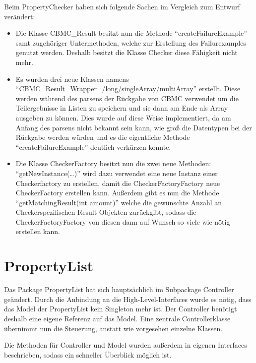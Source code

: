 \documentclass[a4paper]{scrreprt}
\begin{document}
Beim PropertyChecker haben sich folgende Sachen im Vergleich zum Entwurf
verändert:
\begin{itemize}
\item Die Klasse CBMC\_Result besitzt nun die Methode ``createFailureExample''
  samt zugehöriger Untermethoden, welche zur Erstellung des Failurexamples
  genutzt werden. Deshalb besitzt die Klasse Checker diese Fähigkeit nicht mehr.

\item Es wurden drei neue Klassen namens
``CBMC\_Result\_Wrapper\_/long/singleArray/multiArray'' erstellt. Diese werden
während des parsens der Rückgabe von CBMC verwendet um die Teilergebnisse in
Listen zu speichern und sie dann am Ende als Array ausgeben zu können. Dies
wurde auf diese Weise implementiert, da am Anfang des parsens nicht bekannt
sein kann, wie groß die Datentypen bei der Rückgabe werden würden und es die
eigentliche Methode ``createFailureExample'' deutlich verkürzen konnte.

\item Die Klasse CheckerFactory besitzt nun die zwei neue Methoden: \newline
``getNewInstance(\ldots)'' wird dazu verwendet eine neue Instanz einer
Checkerfactory zu erstellen, damit die CheckerFactoryFactory neue CheckerFactory
erstellen kann. \newline Außerdem gibt es nun die Methode ``getMatchingResult(int
amount)'' welche die gewünschte Anzahl an Checkerspezifischen Result Objekten
zurückgibt, sodass die CheckerFactoryFactory von diesen dann auf Wunsch so viele
wie nötig erstellen kann.

\end{itemize}


\section{PropertyList}

Das Package PropertyList hat sich hauptsächlich im Subpackage Controller geändert. Durch die Anbindung an die High-Level-Interfaces wurde es nötig, dass das Model der PropertyList kein Singleton mehr ist. Der Controller benötigt deshalb eine eigene Referenz auf das Model. Eine zentrale Controllerklasse übernimmt nun die Steuerung, anstatt wie vorgesehen einzelne Klassen.

Die Methoden für Controller und Model wurden außerdem in eigenen Interfaces beschrieben, sodass ein schneller Überblick möglich ist.
\end{document}

